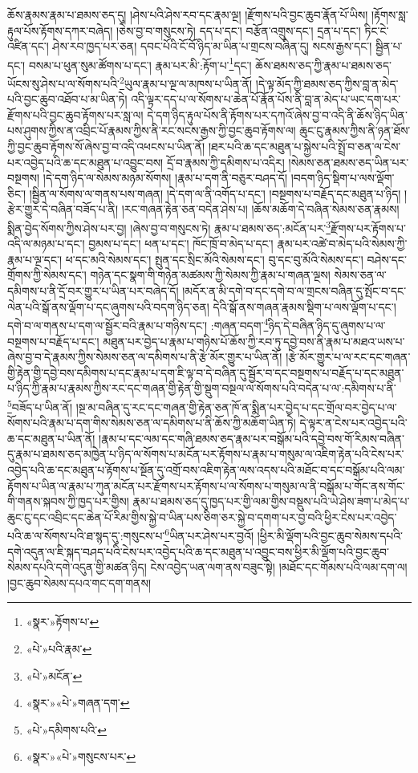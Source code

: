 ཆོས་རྣམས་རྣམ་པ་ཐམས་ཅད་དུ། །ཤེས་པའི་ཤེས་རབ་དང་རྣམ་ལྔ། །རྫོགས་པའི་བྱང་ཆུབ་རྣོན་པོ་ཡིས། །རྟོགས་སླ་རྟུལ་པོས་རྟོགས་དཀར་བཞེད། །ཅེས་བྱ་བ་གསུངས་ཏེ། དད་པ་དང་། བརྩོན་འགྲུས་དང་། དྲན་པ་དང་། ཏིང་ངེ་འཛིན་དང་། ཤེས་རབ་ཁྱད་པར་ཅན། དབང་པོའི་ངོ་བོ་ཉིད་མ་ཡིན་པ་གྲངས་བཞིན་དུ། སངས་རྒྱས་དང་། སྦྱིན་པ་དང་། བསམ་པ་ཕུན་སུམ་ཚོགས་པ་དང་། རྣམ་པར་མི་:རྟོག་པ་\footnote{«སྣར་»རྟོགས་པ་}དང་། ཆོས་ཐམས་ཅད་ཀྱི་རྣམ་པ་ཐམས་ཅད་ཡོངས་སུ་ཤེས་པ་ལ་སོགས་པའི་\footnote{«པེ་»པའི་རྣམ་}ཡུལ་རྣམ་པ་ལྔ་ལ་མཁས་པ་ཡིན་ནོ། །དེ་ལྟ་མོད་ཀྱི་ཐམས་ཅད་ཀྱིས་བླ་ན་མེད་པའི་བྱང་ཆུབ་འཐོབ་པ་མ་ཡིན་ཏེ། འདི་ལྟར་དད་པ་ལ་སོགས་པ་ཆེན་པོ་རྣོན་པོས་ནི་བླ་ན་མེད་པ་ཡང་དག་པར་རྫོགས་པའི་བྱང་ཆུབ་རྟོགས་པར་སླ་ལ། དེ་དག་ཉིད་རྟུལ་པོས་ནི་རྟོགས་པར་དཀའོ་ཞེས་བྱ་བ་འདི་ནི་ཆོས་ཉིད་ཡིན་པས་ཤུགས་ཀྱིས་ན་འབྲིང་པོ་རྣམས་ཀྱིས་ནི་རང་སངས་རྒྱས་ཀྱི་བྱང་ཆུབ་རྟོགས་ལ། ཆུང་ངུ་རྣམས་ཀྱིས་ནི་ཉན་ཐོས་ཀྱི་བྱང་ཆུབ་རྟོགས་སོ་ཞེས་བྱ་བ་འདི་འཕངས་པ་ཡིན་ནོ། །ཐར་པའི་ཆ་དང་མཐུན་པ་སྐྱེས་པའི་སྤྲོ་བ་ཅན་ལ་ངེས་པར་འབྱེད་པའི་ཆ་དང་མཐུན་པ་འབྱུང་བས། དྲོ་བ་རྣམས་ཀྱི་དམིགས་པ་འདིར། །སེམས་ཅན་ཐམས་ཅད་ཡིན་པར་བསྔགས། །དེ་དག་ཉིད་ལ་སེམས་མཉམ་སོགས། །རྣམ་པ་དག་ནི་བཅུར་བཤད་དོ། །བདག་ཉིད་སྡིག་པ་ལས་ལྡོག་ཅིང་། །སྦྱིན་ལ་སོགས་ལ་གནས་པས་གཞན། །དེ་དག་ལ་ནི་འགོད་པ་དང་། །བསྔགས་པ་བརྗོད་དང་མཐུན་པ་ཉིད། །རྩེར་གྱུར་དེ་བཞིན་བཟོད་པ་ནི། །རང་གཞན་རྟེན་ཅན་བདེན་ཤེས་པ། །ཆོས་མཆོག་དེ་བཞིན་སེམས་ཅན་རྣམས། སྨིན་བྱེད་སོགས་ཀྱིས་ཤེས་པར་བྱ། །ཞེས་བྱ་བ་གསུངས་ཏེ། རྣམ་པ་ཐམས་ཅད་:མངོན་པར་\footnote{«པེ་»མངོན་}རྫོགས་པར་རྟོགས་པ་འདི་ལ་མཉམ་པ་དང་། བྱམས་པ་དང་། ཕན་པ་དང་། ཁོང་ཁྲོ་བ་མེད་པ་དང་། རྣམ་པར་འཚེ་བ་མེད་པའི་སེམས་ཀྱི་རྣམ་པ་ལྔ་དང་། ཕ་དང་མའི་སེམས་དང་། སྤུན་དང་སྲིང་མོའི་སེམས་དང་། བུ་དང་བུ་མོའི་སེམས་དང་། བཤེས་དང་གྲོགས་ཀྱི་སེམས་དང་། གཉེན་དང་སྣག་གི་གཉེན་མཚམས་ཀྱི་སེམས་ཀྱི་རྣམ་པ་གཞན་ལྔས། སེམས་ཅན་ལ་དམིགས་པ་ནི་དྲོ་བར་གྱུར་པ་ཡིན་པར་བཞེད་དོ། །མདོར་ན་མི་དགེ་བ་དང་དགེ་བ་ལ་གྲངས་བཞིན་དུ་སྤོང་བ་དང་ལེན་པའི་སྒོ་ནས་ལྡོག་པ་དང་ཞུགས་པའི་བདག་ཉིད་ཅན། དེའི་སྒོ་ནས་གཞན་རྣམས་སྡིག་པ་ལས་ལྡོག་པ་དང་། དགེ་བ་ལ་གནས་པ་དག་ལ་སྦྱོར་བའི་རྣམ་པ་གཉིས་དང་། :གཞན་བདག་\footnote{«སྣར་»«པེ་»གཞན་དག་}ཉིད་དེ་བཞིན་ཉིད་དུ་ཞུགས་པ་ལ་བསྔགས་པ་བརྗོད་པ་དང་། མཐུན་པར་བྱེད་པ་རྣམ་པ་གཉིས་པོ་ཆོས་ཀྱི་རབ་ཏུ་དབྱེ་བས་ནི་རྣམ་པ་མཐའ་ཡས་པ་ཞེས་བྱ་བ་དེ་རྣམས་ཀྱིས་སེམས་ཅན་ལ་དམིགས་པ་ནི་རྩེ་མོར་གྱུར་པ་ཡིན་ནོ། །རྩེ་མོར་གྱུར་པ་ལ་རང་དང་གཞན་གྱི་རྟེན་གྱི་དབྱེ་བས་དམིགས་པ་དང་རྣམ་པ་དག་ཇི་ལྟ་བ་དེ་བཞིན་དུ་སྦྱོར་བ་དང་བསྔགས་པ་བརྗོད་པ་དང་མཐུན་པ་ཉིད་ཀྱི་རྣམ་པ་རྣམས་ཀྱིས་རང་དང་གཞན་གྱི་རྟེན་གྱི་སྡུག་བསྔལ་ལ་སོགས་པའི་བདེན་པ་ལ་:དམིགས་པ་ནི་\footnote{«པེ་»དམིགས་པའི་}བཟོད་པ་ཡིན་ནོ། །སྔ་མ་བཞིན་དུ་རང་དང་གཞན་གྱི་རྟེན་ཅན་ཁོ་ན་སྨིན་པར་བྱེད་པ་དང་གྲོལ་བར་བྱེད་པ་ལ་སོགས་པའི་རྣམ་པ་དག་གིས་སེམས་ཅན་ལ་དམིགས་པ་ནི་ཆོས་ཀྱི་མཆོག་ཡིན་ཏེ། དེ་ལྟར་ན་ངེས་པར་འབྱེད་པའི་ཆ་དང་མཐུན་པ་ཡིན་ནོ། །རྣམ་པ་དང་ལམ་དང་གཞི་ཐམས་ཅད་རྣམ་པར་བསྒོམ་པའི་དབྱེ་བས་གོ་རིམས་བཞིན་དུ་རྣམ་པ་ཐམས་ཅད་མཁྱེན་པ་ཉིད་ལ་སོགས་པ་མངོན་པར་རྟོགས་པ་རྣམ་པ་གསུམ་ལ་འཇིག་རྟེན་པའི་ངེས་པར་འབྱེད་པའི་ཆ་དང་མཐུན་པ་རྟོགས་པ་སྔོན་དུ་འགྲོ་བས་འཇིག་རྟེན་ལས་འདས་པའི་མཐོང་བ་དང་བསྒོམ་པའི་ལམ་རྟོགས་པ་ཡིན་ལ་རྣམ་པ་ཀུན་མངོན་པར་རྫོགས་པར་རྟོགས་པ་ལ་སོགས་པ་གསུམ་ལ་ནི་བསྒོམ་པ་གོང་ནས་གོང་གི་གནས་སྐབས་ཀྱི་ཁྱད་པར་གྱིས། རྣམ་པ་ཐམས་ཅད་དུ་ཁྱད་པར་གྱི་ལམ་གྱིས་བསྡུས་པའི་ཡེ་ཤེས་ཟག་པ་མེད་པ་ཆུང་ངུ་དང་འབྲིང་དང་ཆེན་པོ་རིམ་གྱིས་སྐྱེ་བ་ཡིན་པས་ཅིག་ཅར་སྐྱེ་བ་དགག་པར་བྱ་བའི་ཕྱིར་ངེས་པར་འབྱེད་པའི་ཆ་ལ་སོགས་པའི་ཐ་སྙད་དུ་:གསུངས་པ་\footnote{«སྣར་»«པེ་»གསུངས་པར་}ཡིན་པར་ཤེས་པར་བྱའོ། །ཕྱིར་མི་ལྡོག་པའི་བྱང་ཆུབ་སེམས་དཔའི་དགེ་འདུན་ལ་ཇི་སྐད་བཤད་པའི་ངེས་པར་འབྱེད་པའི་ཆ་དང་མཐུན་པ་འབྱུང་བས་ཕྱིར་མི་ལྡོག་པའི་བྱང་ཆུབ་སེམས་དཔའི་དགེ་འདུན་གྱི་མཚན་ཉིད། ངེས་འབྱེད་ཡན་ལག་ནས་བཟུང་སྟེ། །མཐོང་དང་གོམས་པའི་ལམ་དག་ལ། །བྱང་ཆུབ་སེམས་དཔའ་གང་དག་གནས། 
